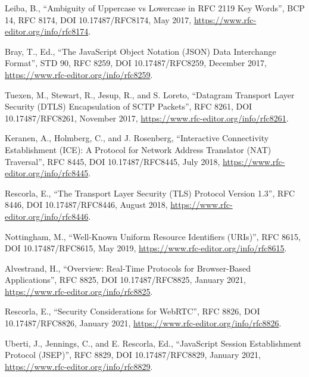 \documentclass{article}
\begin{document}
\begin{description}[style=nextline, leftmargin=2cm, labelwidth=1.8cm]
\item[{[RFC8174]}] Leiba, B., ``Ambiguity of Uppercase vs Lowercase in RFC
  2119 Key Words'', BCP 14, RFC 8174, DOI 10.17487/RFC8174,
  May 2017, \url{https://www.rfc-editor.org/info/rfc8174}.

\item[{[RFC8259]}] Bray, T., Ed., ``The JavaScript Object Notation (JSON) Data
  Interchange Format'', STD 90, RFC 8259,
  DOI 10.17487/RFC8259, December 2017,
  \url{https://www.rfc-editor.org/info/rfc8259}.

\item[{[RFC8261]}] Tuexen, M., Stewart, R., Jesup, R., and S. Loreto,
  ``Datagram Transport Layer Security (DTLS) Encapsulation of
  SCTP Packets'', RFC 8261, DOI 10.17487/RFC8261, November
  2017, \url{https://www.rfc-editor.org/info/rfc8261}.

\item[{[RFC8445]}] Keranen, A., Holmberg, C., and J. Rosenberg, ``Interactive
  Connectivity Establishment (ICE): A Protocol for Network
  Address Translator (NAT) Traversal'', RFC 8445,
  DOI 10.17487/RFC8445, July 2018,
  \url{https://www.rfc-editor.org/info/rfc8445}.

\item[{[RFC8446]}] Rescorla, E., ``The Transport Layer Security (TLS) Protocol
  Version 1.3'', RFC 8446, DOI 10.17487/RFC8446, August 2018,
  \url{https://www.rfc-editor.org/info/rfc8446}.

\item[{[RFC8615]}] Nottingham, M., ``Well-Known Uniform Resource Identifiers
  (URIs)'', RFC 8615, DOI 10.17487/RFC8615, May 2019,
  \url{https://www.rfc-editor.org/info/rfc8615}.

\item[{[RFC8825]}] Alvestrand, H., ``Overview: Real-Time Protocols for
  Browser-Based Applications'', RFC 8825,
  DOI 10.17487/RFC8825, January 2021,
  \url{https://www.rfc-editor.org/info/rfc8825}.

\item[{[RFC8826]}] Rescorla, E., ``Security Considerations for WebRTC'',
  RFC 8826, DOI 10.17487/RFC8826, January 2021,
  \url{https://www.rfc-editor.org/info/rfc8826}.

\item[{[RFC8829]}] Uberti, J., Jennings, C., and E. Rescorla, Ed.,
  ``JavaScript Session Establishment Protocol (JSEP)'',
  RFC 8829, DOI 10.17487/RFC8829, January 2021,
  \url{https://www.rfc-editor.org/info/rfc8829}.


\end{description}
\end{document}
